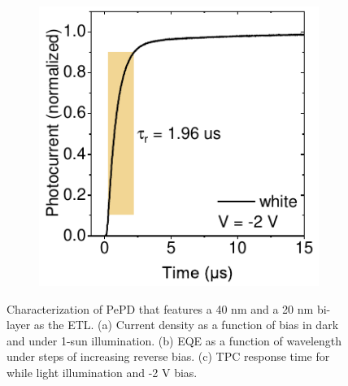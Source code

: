 \begin{figure}[htbp]
\begin{subfigure}{0.32\textwidth}
        \caption{}
        \label{}
    \end{subfigure}
    \hfill
    \begin{subfigure}{0.3\textwidth}
        \centering
        \includegraphics[width=\textwidth]{chapters/transport_layers/images/40C60-20TiO2-rise.pdf}
        \caption{}
    \end{subfigure}
    
    \caption[Overview of electrical characterization for a PePD that features a 40 nm  and a 20 nm  bi-layer as the ETL.]{Characterization of PePD that features a 40 nm  and a 20 nm  bi-layer as the ETL. (a) Current density as a function of bias in dark and under 1-sun illumination. (b) EQE as a function of wavelength under steps of increasing reverse bias. (c) TPC response time for while light illumination and -2 V bias.}
    \label{fig:etl_opt:40C60_20TiO2}
\end{figure}



